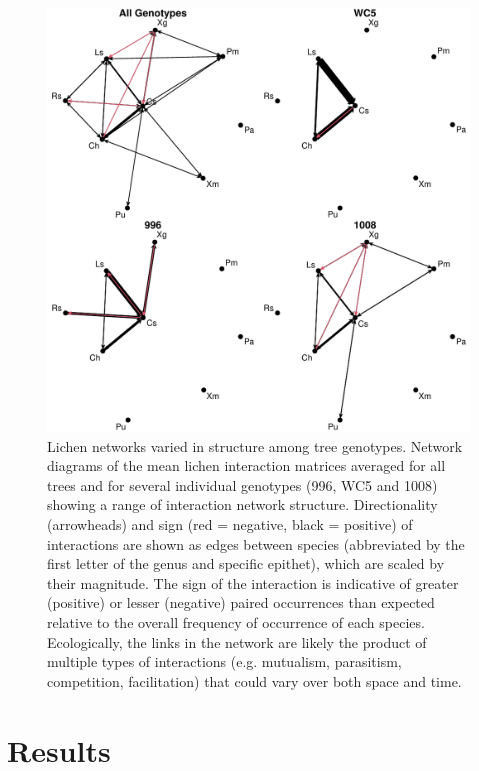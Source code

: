 \documentclass[fleqn,12pt]{olplainarticle}
\begin{document}
\begin{figure}[ht]
\centering
\includegraphics[width=\linewidth]{cn_onc.pdf}
\caption{Lichen networks varied in structure among tree
  genotypes. Network diagrams of the mean lichen interaction matrices
  averaged for all trees and for several individual genotypes (996,
  WC5 and 1008) showing a range of interaction network
  structure. Directionality (arrowheads) and sign (red = negative,
  black = positive) of interactions are shown as edges between species
  (abbreviated by the first letter of the genus and specific epithet),
  which are scaled by their magnitude. The sign of the interaction is
  indicative of greater (positive) or lesser (negative) paired
  occurrences than expected relative to the overall frequency of
  occurrence of each species. Ecologically, the links in the network
  are likely the product of multiple types of interactions
  (e.g. mutualism, parasitism, competition, facilitation) that could
  vary over both space and time.}
\label{fig:geno_nets}
\end{figure}

\section*{Results}
\end{document}
